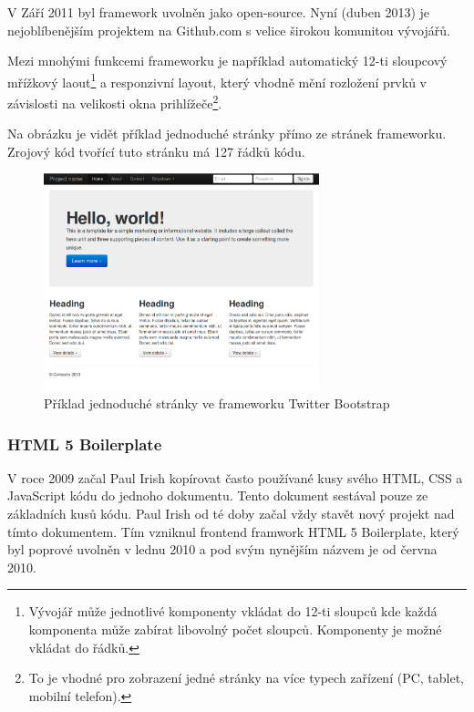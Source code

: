 V Září 2011 byl framework uvolněn jako open-source. Nyní (duben 2013) je nejoblíbenějším projektem na Github.com s velice širokou komunitou vývojářů\cite{website:github-popular}.


Mezi mnohými funkcemi frameworku je například automatický 12-ti sloupcový mřížkový laout\footnote{Vývojář může jednotlivé komponenty vkládat do 12-ti sloupců kde každá komponenta může zabírat libovolný počet sloupců. Komponenty je možné vkládat do řádků.} a responzivní layout, který vhodně mění rozložení prvků v závislosti na velikosti okna prihlížeče\footnote{To je vhodné pro zobrazení jedné stránky na více typech zařízení (PC, tablet, mobilní telefon).}.

Na obrázku je vidět příklad jednoduché stránky přímo ze stránek frameworku. Zrojový kód tvořící tuto stránku má 127 řádků kódu\cite{website:bootstrap-example}.

\begin{figure}[htb]
\begin{center}
\includegraphics[width=80mm]{./pictures/bootstrap-example.png}
\caption{Příklad jednoduché stránky ve frameworku Twitter Bootstrap \cite{website:bootstrap-example}}
\label{fig:bootstrap-example}
\end{center}
\end{figure}

\subsubsection{HTML 5 Boilerplate}
V roce 2009 začal Paul Irish kopírovat často používané kusy svého HTML, CSS a JavaScript kódu do jednoho dokumentu. Tento dokument sestával pouze ze základních kusů kódu. Paul Irish od té doby začal vždy stavět nový projekt nad tímto dokumentem. Tím vzniknul frontend framwork HTML 5 Boilerplate, který byl poprové uvolněn v lednu 2010 a pod svým nynějším názvem je od června 2010.\cite{website:boilerplate-history}

